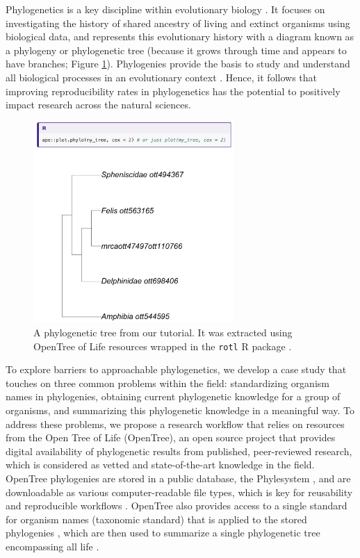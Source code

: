 \documentclass[12pt]{article}
\begin{document}
Phylogenetics is a key discipline within evolutionary biology \citep{dobzhansky1973nothing}.
It focuses on investigating the history of shared ancestry of living and extinct organisms using biological data, and represents this evolutionary history with a diagram known as a phylogeny or phylogenetic tree (because it grows through time and appears to have branches; Figure \ref{fig:tree}).
Phylogenies provide the basis to study and understand all biological processes in an evolutionary context \citep{dobzhansky1973nothing}.
Hence, it follows that improving reproducibility rates in phylogenetics has the potential to positively impact research across the natural sciences.

\begin{figure}
\begin{center}
\includegraphics[width=3in]{fig-tree.png}
\end{center}
\caption{A phylogenetic tree from our tutorial. It was extracted using OpenTree of Life resources \citep{opentreeoflife2019synth} wrapped in the \texttt{rotl} R package \citep{michonneau2016rotl}. \label{fig:tree}}
\end{figure}

To explore barriers to approachable phylogenetics, we develop a case study that touches on three common problems within the field: standardizing organism names in phylogenies, obtaining current phylogenetic knowledge for a group of organisms, and summarizing this phylogenetic knowledge in a meaningful way.
To address these problems, we propose a research workflow that relies on resources from the Open Tree of Life (OpenTree), an open source project that provides digital availability of phylogenetic results from published, peer-reviewed research, which is considered as vetted and state-of-the-art knowledge in the field.
OpenTree phylogenies are stored in a public database, the Phylesystem \citep{mctavish2015phylesystem}, and are downloadable as various computer-readable file types, which is key for reusability and reproducible workflows \citep{wilson2017good}.
OpenTree also provides access to a single standard for organism names (taxonomic standard) that is applied to the stored phylogenies \citep{rees2017automated}, which are then used to summarize a single phylogenetic tree encompassing all life \citep{opentreeoflife2019synth}.
\end{document}
